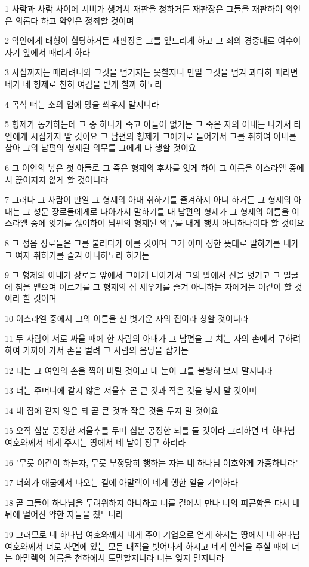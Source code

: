 \par 1 사람과 사람 사이에 시비가 생겨서 재판을 청하거든 재판장은 그들을 재판하여 의인은 의롭다 하고 악인은 정죄할 것이며
\par 2 악인에게 태형이 합당하거든 재판장은 그를 엎드리게 하고 그 죄의 경중대로 여수이 자기 앞에서 때리게 하라
\par 3 사십까지는 때리려니와 그것을 넘기지는 못할지니 만일 그것을 넘겨 과다히 때리면 네가 네 형제로 천히 여김을 받게 할까 하노라
\par 4 곡식 떠는 소의 입에 망을 씌우지 말지니라
\par 5 형제가 동거하는데 그 중 하나가 죽고 아들이 없거든 그 죽은 자의 아내는 나가서 타인에게 시집가지 말 것이요 그 남편의 형제가 그에게로 들어가서 그를 취하여 아내를 삼아 그의 남편의 형제된 의무를 그에게 다 행할 것이요
\par 6 그 여인의 낳은 첫 아들로 그 죽은 형제의 후사를 잇게 하여 그 이름을 이스라엘 중에서 끊어지지 않게 할 것이니라
\par 7 그러나 그 사람이 만일 그 형제의 아내 취하기를 즐겨하지 아니 하거든 그 형제의 아내는 그 성문 장로들에게로 나아가서 말하기를 내 남편의 형제가 그 형제의 이름을 이스라엘 중에 잇기를 싫어하여 남편의 형제된 의무를 내게 행치 아니하나이다 할 것이요
\par 8 그 성읍 장로들은 그를 불러다가 이를 것이며 그가 이미 정한 뜻대로 말하기를 내가 그 여자 취하기를 즐겨 아니하노라 하거든
\par 9 그 형제의 아내가 장로들 앞에서 그에게 나아가서 그의 발에서 신을 벗기고 그 얼굴에 침을 뱉으며 이르기를 그 형제의 집 세우기를 즐겨 아니하는 자에게는 이같이 할 것이라 할 것이며
\par 10 이스라엘 중에서 그의 이름을 신 벗기운 자의 집이라 칭할 것이니라
\par 11 두 사람이 서로 싸울 때에 한 사람의 아내가 그 남편을 그 치는 자의 손에서 구하려 하여 가까이 가서 손을 벌려 그 사람의 음낭을 잡거든
\par 12 너는 그 여인의 손을 찍어 버릴 것이고 네 눈이 그를 불쌍히 보지 말지니라
\par 13 너는 주머니에 같지 않은 저울추 곧 큰 것과 작은 것을 넣지 말 것이며
\par 14 네 집에 같지 않은 되 곧 큰 것과 작은 것을 두지 말 것이요
\par 15 오직 십분 공정한 저울추를 두며 십분 공정한 되를 둘 것이라 그리하면 네 하나님 여호와께서 네게 주시는 땅에서 네 날이 장구 하리라
\par 16 "무릇 이같이 하는자, 무릇 부정당히 행하는 자는 네 하나님 여호와께 가증하니라"
\par 17 너희가 애굽에서 나오는 길에 아말렉이 네게 행한 일을 기억하라
\par 18 곧 그들이 하나님을 두려워하지 아니하고 너를 길에서 만나 너의 피곤함을 타서 네 뒤에 떨어진 약한 자들을 쳤느니라
\par 19 그러므로 네 하나님 여호와께서 네게 주어 기업으로 얻게 하시는 땅에서 네 하나님 여호와께서 너로 사면에 있는 모든 대적을 벗어나게 하시고 네게 안식을 주실 때에 너는 아말렉의 이름을 천하에서 도말할지니라 너는 잊지 말지니라

